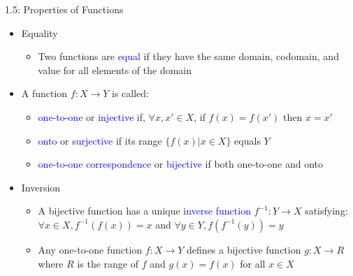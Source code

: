 \documentclass[10pt,english,aspectratio=169,handout]{beamer}
\begin{document}
\begin{frame}{1.5: Properties of Functions}

\begin{itemize}
\setlength\itemsep{3mm}
\item<1-> Equality \vspace{1mm}
\begin{itemize}
  \setlength\itemsep{1.5mm}
  \item Two functions are \textcolor{blue}{equal} if they have the same domain, codomain, and value for all elements of the domain
\end{itemize}

\item<2-> A function $f \colon X \to Y$ is called: \vspace{1mm}
\begin{itemize}
  \setlength\itemsep{1.5mm}
  \item \textcolor{blue}{one-to-one} or \textcolor{blue}{injective} if, $\forall x,x'\in X$, if $f(x)=f(x')$ then $x=x'$
  \item \textcolor{blue}{onto} or \textcolor{blue}{surjective} if its range $\{ f(x) | x\in X\}$ equals $Y$
  \item \textcolor{blue}{one-to-one correspondence} or \textcolor{blue}{bijective} if both one-to-one and onto
\end{itemize}

\item<3-> Inversion \vspace{1mm}
\begin{itemize}
  \setlength\itemsep{1.5mm}
  \item A bijective function has a unique \textcolor{blue}{inverse function} $f^{-1} \colon Y\rightarrow X$ satisfying: $\forall x\in X, f^{-1}(f(x)) = x$ and $\forall y\in Y, f(f^{-1}(y)) = y$
  \item Any one-to-one function $f \colon X\rightarrow Y$ defines a bijective function $g \colon X \rightarrow R$ where $R$ is the range of $f$ and $g(x)=f(x)$ for all $x\in X$

\end{itemize}

\end{itemize}
\end{frame}    
\end{document}
